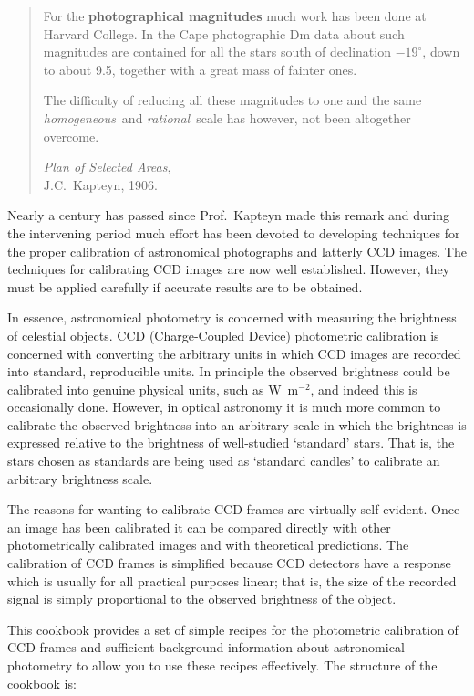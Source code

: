 \documentclass[twoside,11pt]{article}
\begin{document}
\begin{quote}
For the {\bf photographical magnitudes} much work has been done at
Harvard College.  In the Cape photographic Dm data about such magnitudes
are contained for all the stars south of declination $-19^{\circ}$,
down to about 9.5, together with a great mass of fainter ones.

The difficulty of reducing all these magnitudes to one and the same
{\it homogeneous}\, and {\it rational}\, scale has however, not been
altogether overcome. 

{\it Plan of Selected Areas},    \raggedleft \\
J.C.~Kapteyn, 1906.              \raggedleft
\end{quote}

Nearly a century has passed since Prof.~Kapteyn made this remark and
during the intervening period much effort has been devoted to
developing techniques for the proper calibration of astronomical
photographs and latterly CCD images.  The techniques for calibrating
CCD images are now well established.  However, they must be applied
carefully if accurate results are to be obtained.

In essence, astronomical photometry is concerned with measuring the
brightness of celestial objects.  CCD (Charge-Coupled Device) photometric
calibration is concerned with converting the arbitrary units in which CCD
images are recorded into standard, reproducible units.  In principle the
observed brightness could be calibrated into genuine physical units,
such as W~m$^{-2}$, and indeed this is occasionally done.  However, in
optical astronomy it is much more common to calibrate the observed
brightness into an arbitrary scale in which the brightness is
expressed relative to the brightness of well-studied `standard' stars.
That is, the stars chosen as standards are being used as `standard
candles' to calibrate an arbitrary brightness scale.

The reasons for wanting to calibrate CCD frames are virtually
self-evident.  Once an image has been calibrated it can be compared
directly with other photometrically calibrated images and with theoretical
predictions.  The calibration of CCD frames is simplified because CCD
detectors have a response which is usually for all practical purposes
linear; that is, the size of the recorded signal is simply proportional
to the observed brightness of the object.

This cookbook provides a set of simple recipes for the photometric
calibration of CCD frames and sufficient background information about
astronomical photometry to allow you to use these recipes effectively.
The structure of the cookbook is:
\end{document}
